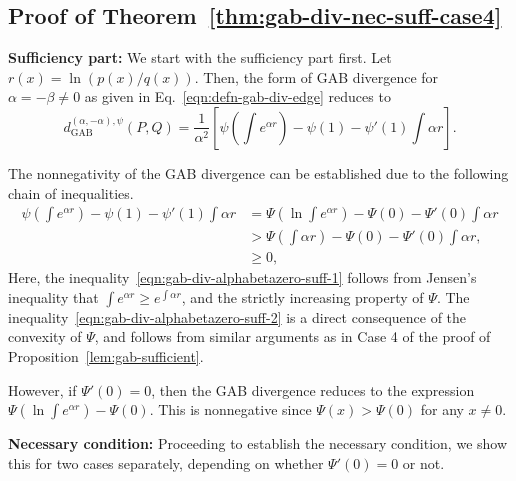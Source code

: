 \documentclass[11pt]{article}
\theoremstyle{plain}
\theoremstyle{remark}
\newcommand{\dGAB}{d_{\mathrm{GAB}}}
\begin{document}
\subsection{Proof of Theorem~\ref{thm:gab-div-nec-suff-case4}}

\textbf{Sufficiency part:} We start with the sufficiency part first. Let $r(x) = \ln(p(x) / q(x))$. Then, the form of GAB divergence for $\alpha = -\beta \neq 0$ as given in Eq.~\eqref{eqn:defn-gab-div-edge} reduces to
\begin{equation}
    \dGAB^{(\alpha,-\alpha),\psi}(P, Q) = \dfrac{1}{\alpha^2} \left[ \psi( \textstyle \int e^{\alpha r} ) - \psi(1) - \psi'(1) \int \alpha r \right].
    \label{eqn:gab-div-alphabetazero}
\end{equation}

The nonnegativity of the GAB divergence can be established due to the following chain of inequalities.
\begin{align}
    \psi( \textstyle \int e^{\alpha r} ) - \psi(1) - \psi'(1) \int \alpha r
     & = \Psi( \textstyle \ln \int e^{\alpha r}) - \Psi(0) - \Psi'(0) \int \alpha r \nonumber                         \\
     & > \Psi( \textstyle \int \alpha r) - \Psi(0) - \Psi'(0) \int \alpha r, \label{eqn:gab-div-alphabetazero-suff-1} \\
     & \geq 0, \label{eqn:gab-div-alphabetazero-suff-2}
\end{align}
\noindent Here, the inequality~\eqref{eqn:gab-div-alphabetazero-suff-1} follows from Jensen's inequality that $\int e^{\alpha r} \geq e^{\int \alpha r}$, and the strictly increasing property of $\Psi$. The inequality~\eqref{eqn:gab-div-alphabetazero-suff-2} is a direct consequence of the convexity of $\Psi$, and follows from similar arguments as in Case 4 of the proof of Proposition~\ref{lem:gab-sufficient}.

However, if $\Psi'(0) = 0$, then the GAB divergence reduces to the expression $\Psi(\ln \textstyle \int e^{\alpha r}) - \Psi(0)$. This is nonnegative since $\Psi(x) > \Psi(0)$ for any $x \neq 0$.



\noindent \textbf{Necessary condition:} Proceeding to establish the necessary condition, we show this for two cases separately, depending on whether $\Psi'(0) = 0$ or not.
\end{document}
